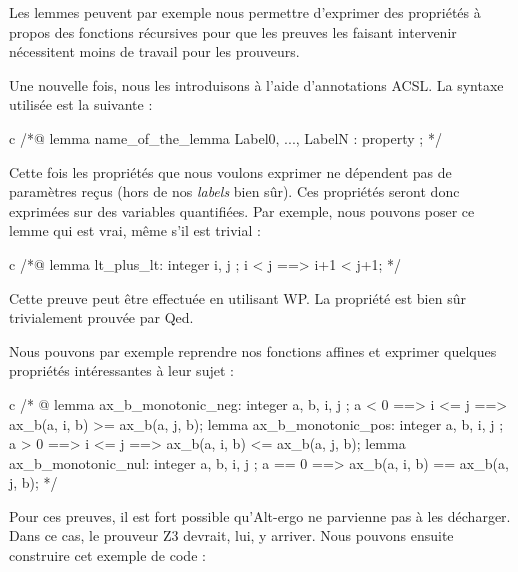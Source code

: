 \documentclass[middle]{zmdocument}
\begin{document}
Les lemmes peuvent par exemple nous permettre d'exprimer des propriétés à 
propos des fonctions récursives pour que les preuves les faisant intervenir 
nécessitent moins de travail pour les prouveurs.





Une nouvelle fois, nous les introduisons à l'aide d'annotations ACSL. La syntaxe
utilisée est la suivante :



\begin{CodeBlock}{c}
/*@
  lemma name_of_the_lemma { Label0, ..., LabelN }:
    property ;
*/
\end{CodeBlock}



Cette fois les propriétés que nous voulons exprimer ne dépendent pas de 
paramètres reçus (hors de nos \textit{labels} bien sûr). Ces propriétés seront donc 
exprimées sur des variables quantifiées. Par exemple, nous pouvons poser ce 
lemme qui est vrai, même s'il est trivial :



\begin{CodeBlock}{c}
/*@
  lemma lt_plus_lt:
    \forall integer i, j ; i < j ==> i+1 < j+1;
*/
\end{CodeBlock}



Cette preuve peut être effectuée en utilisant WP. La propriété est bien sûr 
trivialement prouvée par Qed.





Nous pouvons par exemple reprendre nos fonctions affines et exprimer quelques 
propriétés intéressantes à leur sujet :



\begin{CodeBlock}{c}
/* @
  lemma ax_b_monotonic_neg:
    \forall integer a, b, i, j ;
      a <  0 ==> i <= j ==> ax_b(a, i, b) >= ax_b(a, j, b);
  lemma ax_b_monotonic_pos:
    \forall integer a, b, i, j ;
      a >  0 ==> i <= j ==> ax_b(a, i, b) <= ax_b(a, j, b);
  lemma ax_b_monotonic_nul:
    \forall integer a, b, i, j ;
      a == 0 ==> ax_b(a, i, b) == ax_b(a, j, b);
*/
\end{CodeBlock}



Pour ces preuves, il est fort possible qu'Alt-ergo ne parvienne pas à les 
décharger. Dans ce cas, le prouveur Z3 devrait, lui, y arriver. Nous pouvons 
ensuite construire cet exemple de code :
\end{document}
